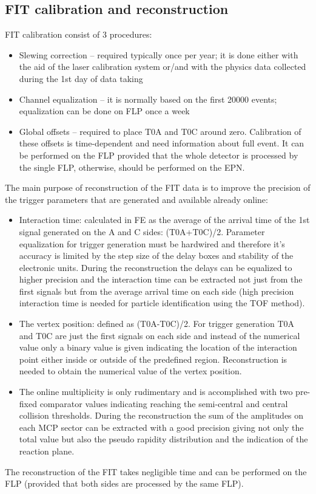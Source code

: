 \subsection{FIT calibration and reconstruction}
\label{FIT:FLP}

FIT calibration consist of 3 procedures:
\begin{itemize}
\item Slewing correction – required typically once per year; it is done either with the aid of the laser calibration 
system or/and with the physics data collected during the 1st day of data taking
\item Channel equalization – it is normally based on the first 20000 events; equalization can be done on FLP once a week
\item Global offsets – required to place T0A and T0C around zero. Calibration of these offsets is time-dependent 
and need information about full event. It can be performed on the FLP provided that the whole detector is processed
by the single FLP, otherwise, should be performed on the EPN.
\end{itemize}

The main purpose of reconstruction of the FIT data is to improve the precision of the
trigger parameters that are generated and available already online:
\begin{itemize}
\item Interaction time: calculated in FE as the average of the arrival time of the 1st signal generated on the 
A and C sides: (T0A+T0C)/2. Parameter equalization for trigger generation must be hardwired and therefore 
it’s accuracy is limited 
by the step size of the delay boxes and stability of the electronic units. 
During the reconstruction the delays can be equalized to higher precision and the interaction 
time can be extracted not just from the first signals but from the average arrival time on each side
(high precision interaction time is needed for particle identification using the TOF method).

\item The vertex position: defined as (T0A-T0C)/2. For trigger generation T0A and T0C are just the first 
signals on each side and instead of the numerical value only a binary value is given indicating the 
location of the interaction point either inside or outside of the predefined region. 
Reconstruction is needed to obtain the numerical value of the vertex position. 

\item The online multiplicity is only rudimentary and is accomplished with two pre-fixed comparator values 
indicating reaching the semi-central and central collision thresholds. 
During the reconstruction the sum of the amplitudes on each MCP sector can be extracted with a good 
precision giving not only the total value but also the pseudo rapidity distribution and the 
indication of the reaction plane. 
\end{itemize}

The reconstruction of the FIT takes negligible time and can be performed on the FLP (provided that both sides are
processed by the same FLP).

